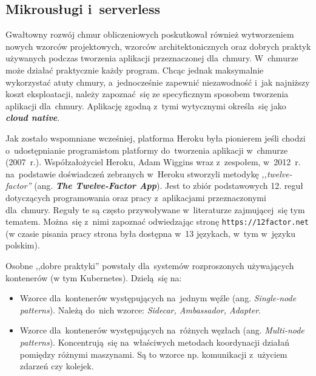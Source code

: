 \documentclass[12pt,a4paper,twoside,titlepage,openright]{book}
\begin{document}
\subsection{Mikrousługi i~serverless} \label{section:mikroserwisy}

Gwałtowny rozwój chmur obliczeniowych poskutkował również wytworzeniem nowych wzorców projektowych, wzorców architektonicznych oraz dobrych praktyk używanych podczas tworzenia aplikacji przeznaczonej dla~chmury. W~chmurze może działać praktycznie każdy program. Chcąc jednak maksymalnie wykorzystać atuty chmury, a~jednocześnie zapewnić niezawodność i~jak najniższy koszt eksploatacji, należy zapoznać~się ze specyficznym sposobem tworzenia aplikacji dla~chmury. Aplikację zgodną z~tymi wytycznymi określa~się jako \textbf{\textit{cloud native}}.

Jak zostało wspomniane wcześniej, platforma Heroku była pionierem jeśli chodzi o~udostępnianie programistom platformy do~tworzenia aplikacji w~chmurze (2007~r.). Współzałożyciel Heroku, Adam Wiggins wraz z~zespołem, w~2012~r. na~podstawie doświadczeń zebranych w~Heroku stworzyli metodykę \textit{,,twelve-factor''} (ang. \textbf{\textit{The Twelve-Factor App}}). Jest to zbiór podstawowych 12. reguł dotyczących programowania oraz pracy z~aplikacjami przeznaczonymi dla~chmury. Reguły te są często przywoływane w~literaturze zajmującej~się tym tematem.\cite{cloudFoundry, microservicesPacktNetCore} Można~się z~nimi zapoznać odwiedzając stronę \texttt{https://12factor.net} (w czasie pisania pracy strona była dostępna w~13 językach, w~tym w~języku polskim).

Osobne ,,dobre praktyki'' powstały dla~systemów rozproszonych używających kontenerów (w tym Kubernetes). Dzielą~się na:
\begin{itemize}
\item Wzorce dla~kontenerów występujących na~jednym węźle (ang. \textit{Single-node patterns}). Należą do~nich wzorce: \textit{Sidecar, Ambassador, Adapter}.
\item Wzorce dla~kontenerów występujących na~różnych węzłach (ang. \textit{Multi-node patterns}). Koncentrują~się na~właściwych metodach koordynacji działań pomiędzy różnymi maszynami. Są to wzorce np. komunikacji z~użyciem zdarzeń czy kolejek.  \cite{kubernetesPacktMastering, distributedSystems}
\end{itemize}
\end{document}
